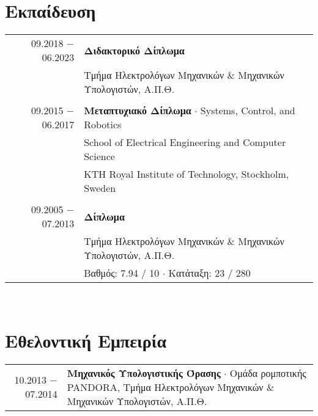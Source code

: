 \documentclass[a4paper,10pt,twoside]{article}
\begin{document}

\section{Εκπαίδευση}

\begin{tabular}{rp{11cm}}
09.2018 $-$ 06.2023 & \textbf{Διδακτορικό Δίπλωμα} \\
                    & Τμήμα Ηλεκτρολόγων Μηχανικών \& Μηχανικών Υπολογιστών, Α.Π.Θ.\\
&\\
09.2015 $-$ 06.2017 & \textbf{Μεταπτυχιακό Δίπλωμα} $\cdot$ Systems, Control, and Robotics\\
                    & School of Electrical Engineering and Computer Science \\
                    & KTH Royal Institute of Technology, Stockholm, Sweden\\
&\\
09.2005 $-$ 07.2013 & \textbf{Δίπλωμα} \\
                    & Τμήμα Ηλεκτρολόγων Μηχανικών \& Μηχανικών Υπολογιστών, Α.Π.Θ.\\
                    & {\small Βαθμός: 7.94 / 10 $\cdot$ Κατάταξη: 23 / 280}
\end{tabular}\\



\section{Εθελοντική Εμπειρία}

\begin{tabular}{rp{12cm}}
10.2013 $-$ 07.2014 & \textbf{Μηχανικός Υπολογιστικής Όρασης} $\cdot$ Ομάδα ρομποτικής PANDORA, Τμήμα Ηλεκτρολόγων Μηχανικών \& Μηχανικών Υπολογιστών, Α.Π.Θ.\\
\end{tabular} \\


\end{document}
